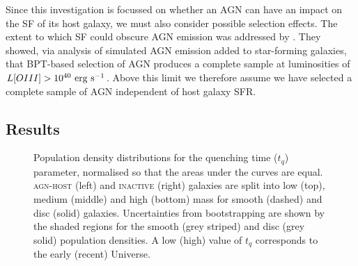 Since this investigation is focussed on whether an AGN can have an impact on the SF of its host galaxy, we must also consider  possible selection effects. The extent to which SF could obscure AGN emission was addressed by \cite{schawinski10a}. They showed, via analysis of simulated AGN emission added to star-forming galaxies, that BPT-based selection of AGN produces a complete sample at luminosities of $L[OIII] > 10^{40}~\rm{erg~s}^{-1}$. Above this limit we therefore assume we have selected a complete sample of AGN independent of host galaxy SFR.


\subsection{Results}\label{results}

\begin{figure}
\caption[Quenching time population density distributions for the \textsc{agn-host} and \textsc{inactive} samples] {Population density distributions for the quenching time ($t_q$) parameter, normalised so that the areas under the curves are equal. \textsc{agn-host} (left) and \textsc{inactive} (right) galaxies are split into low (top), medium (middle) and high (bottom) mass for smooth (dashed) and disc (solid) galaxies. Uncertainties from bootstrapping are shown by the shaded regions for the smooth (grey striped) and disc (grey solid) population densities. A low (high) value of $t_q$ corresponds to the early (recent) Universe.}
\label{time}
\end{figure}


